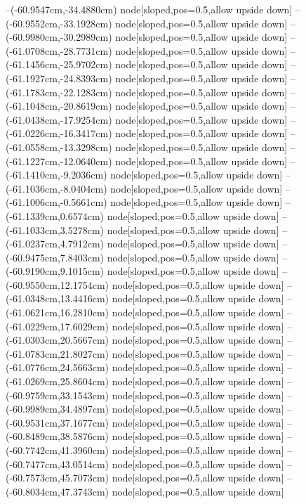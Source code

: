 --(-60.9547cm,-34.4880cm) node[sloped,pos=0.5,allow upside down]{\ArrowIn}
--(-60.9552cm,-33.1928cm) node[sloped,pos=0.5,allow upside down]{\ArrowIn}
--(-60.9980cm,-30.2989cm) node[sloped,pos=0.5,allow upside down]{\ArrowIn}
--(-61.0708cm,-28.7731cm) node[sloped,pos=0.5,allow upside down]{\ArrowIn}
--(-61.1456cm,-25.9702cm) node[sloped,pos=0.5,allow upside down]{\ArrowIn}
--(-61.1927cm,-24.8393cm) node[sloped,pos=0.5,allow upside down]{\ArrowIn}
--(-61.1783cm,-22.1283cm) node[sloped,pos=0.5,allow upside down]{\ArrowIn}
--(-61.1048cm,-20.8619cm) node[sloped,pos=0.5,allow upside down]{\ArrowIn}
--(-61.0438cm,-17.9254cm) node[sloped,pos=0.5,allow upside down]{\ArrowIn}
--(-61.0226cm,-16.3417cm) node[sloped,pos=0.5,allow upside down]{\ArrowIn}
--(-61.0558cm,-13.3298cm) node[sloped,pos=0.5,allow upside down]{\ArrowIn}
--(-61.1227cm,-12.0640cm) node[sloped,pos=0.5,allow upside down]{\ArrowIn}
--(-61.1410cm,-9.2036cm) node[sloped,pos=0.5,allow upside down]{\ArrowIn}
--(-61.1036cm,-8.0404cm) node[sloped,pos=0.5,allow upside down]{\ArrowIn}
--(-61.1006cm,-0.5661cm) node[sloped,pos=0.5,allow upside down]{\ArrowIn}
--(-61.1339cm,0.6574cm) node[sloped,pos=0.5,allow upside down]{\ArrowIn}
--(-61.1033cm,3.5278cm) node[sloped,pos=0.5,allow upside down]{\ArrowIn}
--(-61.0237cm,4.7912cm) node[sloped,pos=0.5,allow upside down]{\ArrowIn}
--(-60.9475cm,7.8403cm) node[sloped,pos=0.5,allow upside down]{\ArrowIn}
--(-60.9190cm,9.1015cm) node[sloped,pos=0.5,allow upside down]{\ArrowIn}
--(-60.9550cm,12.1754cm) node[sloped,pos=0.5,allow upside down]{\ArrowIn}
--(-61.0348cm,13.4416cm) node[sloped,pos=0.5,allow upside down]{\ArrowIn}
--(-61.0621cm,16.2810cm) node[sloped,pos=0.5,allow upside down]{\ArrowIn}
--(-61.0229cm,17.6029cm) node[sloped,pos=0.5,allow upside down]{\ArrowIn}
--(-61.0303cm,20.5667cm) node[sloped,pos=0.5,allow upside down]{\ArrowIn}
--(-61.0783cm,21.8027cm) node[sloped,pos=0.5,allow upside down]{\ArrowIn}
--(-61.0776cm,24.5663cm) node[sloped,pos=0.5,allow upside down]{\ArrowIn}
--(-61.0269cm,25.8604cm) node[sloped,pos=0.5,allow upside down]{\ArrowIn}
--(-60.9759cm,33.1543cm) node[sloped,pos=0.5,allow upside down]{\ArrowIn}
--(-60.9989cm,34.4897cm) node[sloped,pos=0.5,allow upside down]{\ArrowIn}
--(-60.9531cm,37.1677cm) node[sloped,pos=0.5,allow upside down]{\ArrowIn}
--(-60.8489cm,38.5876cm) node[sloped,pos=0.5,allow upside down]{\ArrowIn}
--(-60.7742cm,41.3960cm) node[sloped,pos=0.5,allow upside down]{\ArrowIn}
--(-60.7477cm,43.0514cm) node[sloped,pos=0.5,allow upside down]{\ArrowIn}
--(-60.7573cm,45.7073cm) node[sloped,pos=0.5,allow upside down]{\ArrowIn}
--(-60.8034cm,47.3743cm) node[sloped,pos=0.5,allow upside down]{\ArrowIn}
